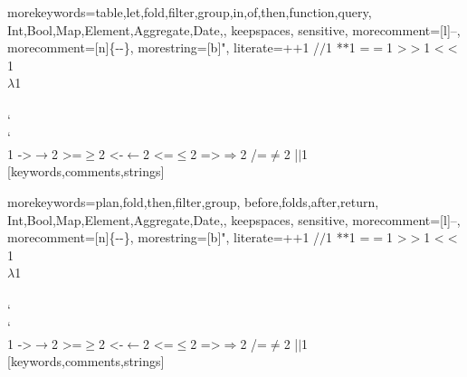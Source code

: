 

%
  {morekeywords={table,let,fold,filter,group,in,of,then,function,query,%
                Int,Bool,Map,Element,Aggregate,Date,},%
   keepspaces,%
   sensitive,%
   morecomment=[l]--,%
   morecomment=[n]{\{-}{-\}},%
   morestring=[b]",%
   literate={+}{{$+$}}1 {/}{{$/$}}1 {*}{{$*$}}1 {=}{{$=$}}1
            {>}{{$>$}}1 {<}{{$<$}}1 {\\}{{$\lambda$}}1
            {\\\\}{{\char`\\\char`\\}}1
            {->}{{$\rightarrow$}}2 {>=}{{$\geq$}}2 {<-}{{$\leftarrow$}}2
            {<=}{{$\leq$}}2 {=>}{{$\Rightarrow$}}2 
            {/=}{{$\ne$}}2
            {|}{{$\mid$}}1
  }[keywords,comments,strings]%

%
  {morekeywords={plan,fold,then,filter,group,%
                before,folds,after,return,%
                Int,Bool,Map,Element,Aggregate,Date,},%
   keepspaces,%
   sensitive,%
   morecomment=[l]--,%
   morecomment=[n]{\{-}{-\}},%
   morestring=[b]",%
   literate={+}{{$+$}}1 {/}{{$/$}}1 {*}{{$*$}}1 {=}{{$=$}}1
            {>}{{$>$}}1 {<}{{$<$}}1 {\\}{{$\lambda$}}1
            {\\\\}{{\char`\\\char`\\}}1
            {->}{{$\rightarrow$}}2 {>=}{{$\geq$}}2 {<-}{{$\leftarrow$}}2
            {<=}{{$\leq$}}2 {=>}{{$\Rightarrow$}}2 
            {/=}{{$\ne$}}2
            {|}{{$\mid$}}1
  }[keywords,comments,strings]%

